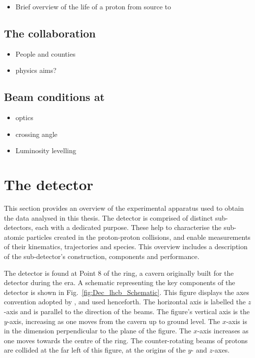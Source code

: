 {\color{Red}
\begin{itemize}
\item Brief overview of the life of a proton from source to \lhc
\end{itemize}
}

\subsection{The \lhcb collaboration} 
{\color{Red}
\begin{itemize}
\item People and counties 
\item physics aims?
\end{itemize}
}
\subsection{Beam conditions at \lhcb}
{\color{Red}
\begin{itemize}
\item \lhc optics
\item crossing angle
\item Luminosity levelling
\end{itemize}
}


\section{The \lhcb detector}

This section provides an overview of the experimental apparatus used to obtain the data analysed in this thesis.
The \lhcb detector is comprised of distinct sub-detectors, each with a dedicated purpose. These help to characterise the sub-atomic particles created in the proton-proton collisions, and enable measurements of their kinematics, trajectories and species.
This overview includes a description of the sub-detector's construction, components and performance. 

The \lhcb detector is found at Point 8 of the \lhc ring, a cavern originally built for the {\color{Red}\delphi} detector during the \lep era. A schematic representing the key components of the \lhcb detector is shown in Fig.~\ref{fig:Dec_lhcb_Schematic}. This figure displays the axes convention adopted by \lhcb, and used henceforth. The horizontal axis is labelled the $z$-axis and is parallel to the direction of the beams. The figure's vertical axis is the $y$-axis, increasing as one moves from the cavern up to ground level. The $x$-axis is in the dimension perpendicular to the plane of the figure. The $x$-axis increases as one moves towards the centre of the \lhc ring. The counter-rotating beams of protons are collided at the far left of this figure, at the origins of the $y$- and $z$-axes.   

